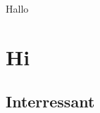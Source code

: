 \documentclass[Typ=LIMERENCE,Semester=2,Vorlesung=PDP]{Lilly}
\begin{document}
Hallo

\clearpage



\chapter{Hi}
\section{Interressant}
\end{document}
